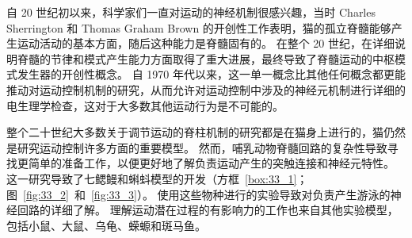 自 20 世纪初以来，科学家们一直对运动的神经机制很感兴趣，当时 Charles Sherrington 和 Thomas Graham Brown 的开创性工作表明，猫的孤立脊髓能够产生运动活动的基本方面，随后这种能力是脊髓固有的。
在整个 20 世纪，在详细说明脊髓的节律和模式产生能力方面取得了重大进展，最终导致了脊髓运动的中枢模式发生器的开创性概念。
自 1970 年代以来，这一单一概念比其他任何概念都更能推动对运动控制机制的研究，从而允许对运动控制中涉及的神经元机制进行详细的电生理学检查，这对于大多数其他运动行为是不可能的。


整个二十世纪大多数关于调节运动的脊柱机制的研究都是在猫身上进行的，猫仍然是研究运动控制许多方面的重要模型。
然而，哺乳动物脊髓回路的复杂性导致寻找更简单的准备工作，以便更好地了解负责运动产生的突触连接和神经元特性。
这一研究导致了七鳃鳗和蝌蚪模型的开发（方框~\ref{box:33_1}；图~\ref{fig:33_2}~和~\ref{fig:33_3}）。
使用这些物种进行的实验导致对负责产生游泳的神经回路的详细了解。
理解运动潜在过程的有影响力的工作也来自其他实验模型，包括小鼠、大鼠、乌龟、蝾螈和斑马鱼。



